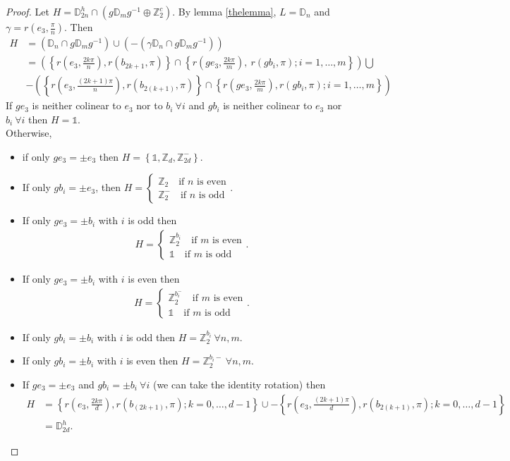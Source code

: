 \documentclass[11pt,a4paper]{amsart}
\theoremstyle{definition}
\newcommand{\ZZ}{\mathbb{Z}}                %
\newcommand{\DD}{\mathbb{D}}                %
\newcommand{\1}{\mathds{1}}		            %
\newcommand{\set}[1]{\left\{#1\right\}}     %
\begin{document}
\begin{proof}
Let $H=\DD_{2n}^h \cap (g\DD_m g^{-1} \oplus \ZZ_2^c)$.
By lemma \ref{thelemma}, $L=\DD_n$ and $\gamma=r(e_3,\frac{\pi}{n})$. Then
\begin{align*}
H&=(\DD_n\cap g \DD_m g^{-1})\cup (-(\gamma\DD_n\cap g \DD_m g^{-1}))\\
 &=\left(\set{r(e_3,\frac{2k\pi}{n}),r(b_{2k+1},\pi)}\cap \set{r(ge_3,\frac{2k\pi}{m}),\ r(gb_i,\pi); i=1,\dotsc,m}\right)\bigcup\\
 &-\left(\set{r(e_3,\frac{(2k+1)\pi}{n}),r(b_{2(k+1)},\pi)}\cap \set{r(ge_3,\frac{2k\pi}{m}),r(gb_i,\pi); i=1,\dotsc,m}\right)
\end{align*}
If $ge_3$ is neither colinear to $e_3$ nor to $b_i \ \forall i$ and $gb_i$ is neither colinear to $e_3$ nor $b_i\ \forall i$ then $H=\1$.\\
Otherwise,
\begin{itemize}
\item if only $ge_3=\pm e_3$ then $H=\set{\1,\ZZ_d,\ZZ_{2d}^-}$.
\item If only $gb_i=\pm e_3$, then $H=
\begin{cases}
\ZZ_2 \quad \text{if $n$ is even}\\
\ZZ_2^- \quad \text{if $n$ is odd}
\end{cases}$.
\item If only $ge_3=\pm b_i$ with $i$ is odd then
\begin{align*}
H=
\begin{cases}
\ZZ_2^{b_i} \quad \text{if $m$ is even}\\
\1 \quad \text{if $m$ is odd}
\end{cases}.
\end{align*}
\item If only $ge_3=\pm b_i$ with $i$ is even then
\begin{align*}
H=
\begin{cases}
\ZZ_2^{b_i^-} \quad \text{if $m$ is even}\\
\1 \quad \text{if $m$ is odd}
\end{cases}.
\end{align*}
\item If only $gb_i=\pm b_i$ with $i$ is odd then $H=\ZZ_2^{b_i} \ \forall n,m$.
\item If only $gb_i=\pm b_i$ with $i$ is even then $H=\ZZ_2^{b_i-} \ \forall n,m.$
\item If $ge_3=\pm e_3$ and $gb_i=\pm b_i \ \forall i$ (we can take the identity rotation) then
\begin{align*}
H&=\set{r(e_3,\frac{2k\pi}{d}),r(b_{(2k+1)},\pi);k=0,\dotsc,d-1}\cup-\set{r(e_3,\frac{(2k+1)\pi}{d}),r(b_{2(k+1)},\pi);k=0,\dotsc,d-1}\\
 &=\DD_{2d}^h.
\end{align*}
\end{itemize}
\end{proof}
\end{document}
